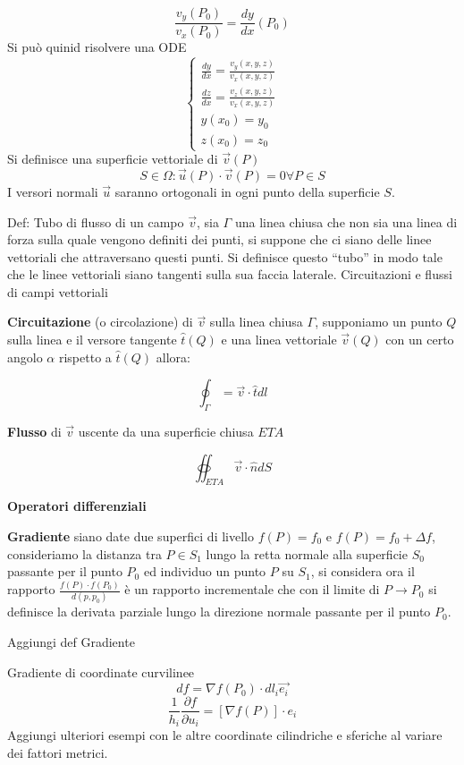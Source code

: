 $$
\frac{v_y(P_0)}{v_x(P_0)} = \frac{dy}{dx}(P_0)
$$
Si può quinid risolvere una ODE
$$
\begin{cases}
\frac{dy}{dx} = \frac{v_y(x,y,z)}{v_x(x,y,z)} \\
\frac{dz}{dx} = \frac{v_z(x,y,z)}{v_x(x,y,z)}\\
y(x_0) = y_0 \\
z(x_0) = z_0
\end{cases}
$$
Si definisce una superficie vettoriale di $\vec{v}(P)$
$$
S\in \Omega: \vec{u}(P)\cdot\vec{v}(P) = 0 \forall P \in S
$$
I versori normali $\vec{u}$ saranno ortogonali in ogni punto della superficie $S$.

Def: Tubo di flusso di un campo $\vec{v}$, sia $\Gamma$ una linea chiusa che non sia una linea di forza
sulla quale vengono definiti dei punti, si suppone che ci siano delle linee vettoriali che attraversano
questi punti. Si definisce questo ``tubo'' in modo tale che le linee vettoriali siano tangenti sulla sua faccia laterale.
\newpage
Circuitazioni e flussi di campi vettoriali

\textbf{Circuitazione} (o circolazione) di $\vec{v}$ sulla linea chiusa $\Gamma$, supponiamo un punto $Q$ sulla 
linea e il versore tangente $\hat{t}(Q)$ e una linea vettoriale $\vec{v}(Q)$ con un certo angolo
$\alpha$ rispetto a $\hat{t}(Q)$ allora:

$$
\oint_{\Gamma} = \vec{v}\cdot\hat{t}dl 
$$

\textbf{Flusso} di $\vec{v}$ uscente da una superficie chiusa $ETA$

$$
\oiint_{ETA}\vec{v}\cdot\hat{n}dS
$$

\textbf{Operatori differenziali}

\textbf{Gradiente} siano date due superfici di livello $f(P) = f_0$ e $f(P) = f_0 + \Delta f$, consideriamo la distanza tra $P\in S_1$ lungo la retta normale alla superficie $S_0$ passante per il punto 
$P_0$ ed individuo un punto $P$ su $S_1$, si considera ora il rapporto $\frac{f(P)\cdot f(P_0)}{d(p,p_0)}$ è un rapporto incrementale che con il limite di $P\to P_0$ si definisce la derivata parziale lungo la
direzione normale passante per il punto $P_0$.

Aggiungi def Gradiente

Gradiente di coordinate curvilinee
$$
df = \nabla f (P_0) \cdot dl_i\vec{e_i}
$$
$$
\frac{1}{h_i} \frac{\partial f}{\partial u_i} = \left[\nabla f (P)\right]\cdot e_i
$$
Aggiungi ulteriori esempi con le altre coordinate cilindriche e sferiche al variare dei fattori metrici.


